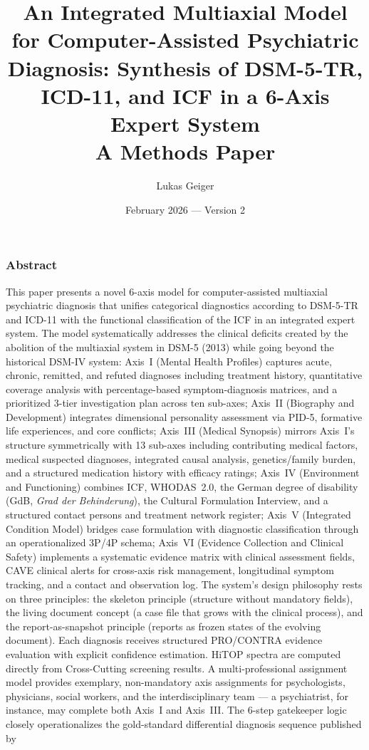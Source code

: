 \documentclass[11pt,a4paper]{article}
\begin{document}
\title{\textbf{An Integrated Multiaxial Model for Computer-Assisted Psychiatric Diagnosis: Synthesis of DSM-5-TR, ICD-11, and ICF in a 6-Axis Expert System}\\[0.3em]
\large A Methods Paper}

\author{Lukas Geiger}
\date{February 2026 --- Version 2}

\maketitle

\subsubsection*{Abstract}

This paper presents a novel 6-axis model for computer-assisted multiaxial psychiatric diagnosis that unifies categorical diagnostics according to DSM-5-TR and ICD-11 with the functional classification of the ICF in an integrated expert system. The model systematically addresses the clinical deficits created by the abolition of the multiaxial system in DSM-5 (2013) while going beyond the historical DSM-IV system: Axis~I (Mental Health Profiles) captures acute, chronic, remitted, and refuted diagnoses including treatment history, quantitative coverage analysis with percentage-based symptom-diagnosis matrices, and a prioritized 3-tier investigation plan across ten sub-axes; Axis~II (Biography and Development) integrates dimensional personality assessment via PID-5, formative life experiences, and core conflicts; Axis~III (Medical Synopsis) mirrors Axis~I's structure symmetrically with 13 sub-axes including contributing medical factors, medical suspected diagnoses, integrated causal analysis, genetics/family burden, and a structured medication history with efficacy ratings; Axis~IV (Environment and Functioning) combines ICF, WHODAS~2.0, the German degree of disability (GdB, \textit{Grad der Behinderung}), the Cultural Formulation Interview, and a structured contact persons and treatment network register; Axis~V (Integrated Condition Model) bridges case formulation with diagnostic classification through an operationalized 3P/4P schema; Axis~VI (Evidence Collection and Clinical Safety) implements a systematic evidence matrix with clinical assessment fields, CAVE clinical alerts for cross-axis risk management, longitudinal symptom tracking, and a contact and observation log. The system's design philosophy rests on three principles: the skeleton principle (structure without mandatory fields), the living document concept (a case file that grows with the clinical process), and the report-as-snapshot principle (reports as frozen states of the evolving document). Each diagnosis receives structured PRO/CONTRA evidence evaluation with explicit confidence estimation. HiTOP spectra are computed directly from Cross-Cutting screening results. A multi-professional assignment model provides exemplary, non-mandatory axis assignments for psychologists, physicians, social workers, and the interdisciplinary team --- a psychiatrist, for instance, may complete both Axis~I and Axis~III. The 6-step gatekeeper logic closely operationalizes the gold-standard differential diagnosis sequence published by 
\end{document}
